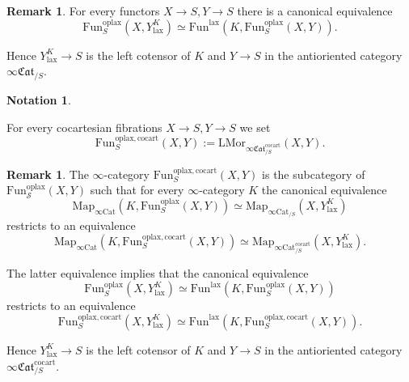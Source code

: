 \documentclass[10pt,oneside]{article}
\numberwithin{equation}{section} %
\numberwithin{figure}{section} %
\theoremstyle{plain}
\theoremstyle{definition}
\newtheorem{notation}[theorem]{Notation}
\newtheorem{remark}[theorem]{Remark}
\newcommand{\K}{{K}}
\newcommand{\rS}{{S}}
\newcommand{\X}{X}
\newcommand{\Y}{Y}
\renewcommand{\S}{\mathcal{S}}
\newcommand{\Cat}{\mathrm{Cat}}
\newcommand{\Fun}{\mathrm{Fun}}
\newcommand{\cocart}{{\mathrm{cocart}}}
\newcommand{\lax}{{\mathrm{lax}}}
\newcommand{\oplax}{{\mathrm{oplax}}}
\newcommand{\Map}{{\mathrm{Map}}}
\newcommand{\LMor}{\mathrm{LMor}}
\newcommand{\fcat}{\mathfrak{Cat}}
\begin{document}
\begin{remark}For every functors $X \to S, Y \to S$ there is a canonical equivalence
$$ \Fun^\oplax_S(X,Y^K_\lax) \simeq \Fun^\lax(K,\Fun^\oplax_S(X,Y)).$$

Hence  $Y^K_\lax \to S$ is the left cotensor of $\K$ and $Y \to S$ in the antioriented category $\infty\fcat_{/S}.$

\end{remark}

\begin{notation}\label{univeqr}
    
For every cocartesian fibrations $X \to S, Y \to S$ 
we set $$\Fun^{\oplax, \cocart}_S(X,Y) := \LMor_{\infty\fcat^\cocart_{/S}}(\X,\Y).$$

\end{notation}

\begin{remark}

The $\infty$-category $\Fun^{\oplax, \cocart}_S(X,Y)$ is the subcategory of $\Fun^\oplax_\S(\X,\Y)$ such that for every $\infty$-category $K$  the canonical equivalence
$$\Map_{\infty\Cat}(K,\Fun^{\oplax}_S(X,Y)) \simeq \Map_{\infty\Cat_{/\rS}}(X,Y^K_\lax)$$
restricts to an equivalence
$$\Map_{\infty\Cat}(K,\Fun^{\oplax, \cocart}_S(X,Y)) \simeq \Map_{\infty\Cat^\cocart_{/\rS}}(X,Y^K_\lax).$$

The latter equivalence implies that the canonical equivalence
$$ \Fun^\oplax_S(X,Y^K_\lax) \simeq \Fun^\lax(K,\Fun^\oplax_S(X,Y))$$
restricts to an equivalence 
$$ \Fun^{\oplax, \cocart}_S(X,Y^K_\lax) \simeq \Fun^\lax(K,\Fun^{\oplax, \cocart}_S(X,Y)).$$

Hence  $Y^K_\lax \to S$ is the left cotensor of $\K$ and $Y \to S$ in the antioriented category $\infty\fcat^\cocart_{/S}.$
    
\end{remark}


    
\end{document}
